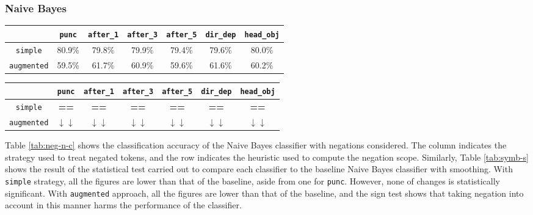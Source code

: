 \subsubsection{Naive Bayes}
\begin{table*}[t]
\centering
\caption{Classification Accuracy of Naive Bayes Classifier with Negation}
\label{tab:neg-n-c}
\begin{tabular}{|c|c|c|c|c|c|c|}
\hline
 & \texttt{punc}& \texttt{after\_1}& \texttt{after\_3}&  \texttt{after\_5} & \texttt{dir\_dep}& \texttt{head\_obj}  \\ \hline
 \texttt{simple} & 80.9\% & 79.8\% & 79.9\%  & 79.4\% & 79.6\% & 80.0\% \\ \hline
\texttt{augmented} & 59.5\% & 61.7\% & 60.9\%  & 59.6\% & 61.6\% & 60.2\%  \\ \hline
\end{tabular}
\end{table*}
\begin{table*}[t]
\centering
\caption{Significance Results of Naive Bayes Classifier with Negation}
\label{tab:neg-n-c}
\begin{tabular}{|c|c|c|c|c|c|c|}
\hline
 & \texttt{punc}& \texttt{after\_1}& \texttt{after\_3}&  \texttt{after\_5} & \texttt{dir\_dep}& \texttt{head\_obj}  \\ \hline
 \texttt{simple} & \textbf{==}& \textbf{==} & \textbf{==}  & \textbf{==}  & \textbf{==} & \textbf{==}\\ \hline
\texttt{augmented} & \textbf{$\downarrow\downarrow$}& \textbf{$\downarrow\downarrow$} & \textbf{$\downarrow\downarrow$}  & \textbf{$\downarrow\downarrow$}  & \textbf{$\downarrow\downarrow$} & \textbf{$\downarrow\downarrow$}\\ \hline
\end{tabular}
\end{table*}
Table \ref{tab:neg-n-c} shows the classification accuracy of the Naive Bayes classifier with negations considered. The column indicates the strategy used to treat negated tokens, and the row indicates the heuristic used to compute the negation scope. Similarly, Table \ref{tab:symb-s} shows the result of the statistical test carried out to compare each classifier to the baseline Naive Bayes classifier with smoothing. With \texttt{simple} strategy, all the figures are lower than that of the baseline, aside from one for \texttt{punc}. However, none of changes is statistically significant. With \texttt{\texttt{augmented}} approach, all the figures are lower than that of the baseline, and the sign test shows that taking negation into account in this manner harms the performance of the classifier.

